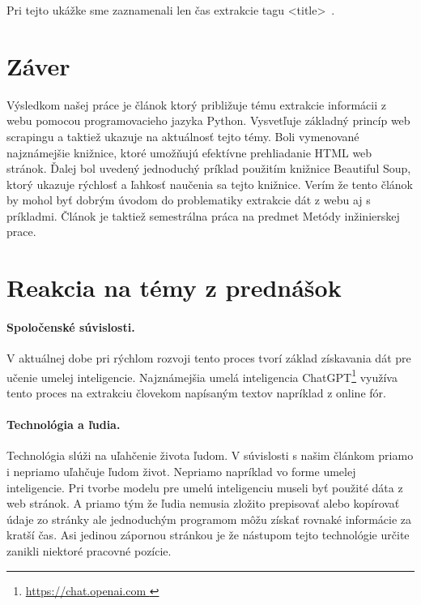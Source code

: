 \documentclass[10pt,twoside,slovak,a4paper]{article}
\begin{document}
Pri tejto ukážke sme zaznamenali len čas extrakcie tagu \textless title\textgreater~.

\section{Záver} \label{zaver} %
Výsledkom našej práce je článok ktorý približuje tému extrakcie informácii z webu pomocou programovacieho jazyka Python. Vysvetľuje základný princíp web scrapingu a taktiež ukazuje na aktuálnosť tejto témy. Boli vymenované najznámejšie knižnice, ktoré umožňujú efektívne prehliadanie HTML web stránok. Ďalej bol uvedený jednoduchý príklad použitím knižnice Beautiful Soup, ktorý ukazuje rýchlosť a ľahkosť naučenia sa tejto knižnice. Verím že tento článok by mohol byť dobrým úvodom do problematiky extrakcie dát z webu aj s príkladmi. Článok je taktiež semestrálna práca na predmet Metódy inžinierskej prace.

\section{Reakcia na témy z prednášok} \label{reakcia}
\paragraph{Spoločenské súvislosti.}\label{spoloc}
V aktuálnej dobe pri rýchlom rozvoji tento proces tvorí základ získavania dát pre učenie umelej inteligencie. Najznámejšia umelá inteligencia ChatGPT\footnote{\url{ https://chat.openai.com }} využíva tento proces na extrakciu človekom napísaným textov napríklad z online fór\cite{openaiWhatChatGPT}.

\paragraph{Technológia a ľudia.}
Technológia slúži na uľahčenie života ľudom. V súvislosti s našim článkom priamo i nepriamo uľahčuje ľudom život. Nepriamo napríklad vo forme umelej inteligencie. Pri tvorbe modelu pre umelú inteligenciu museli byť použité dáta z web stránok. A priamo tým že ľudia nemusia zložito prepisovať alebo kopírovať údaje zo stránky ale jednoduchým programom môžu získať rovnaké informácie za kratší čas. Asi jedinou zápornou stránkou je že nástupom tejto technológie určite zanikli niektoré pracovné pozície.
\end{document}
